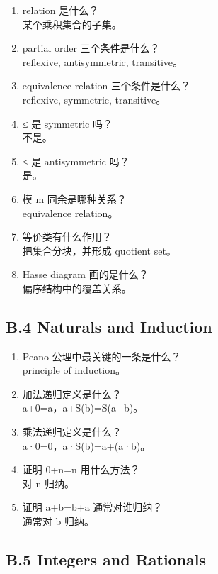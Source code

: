 \documentclass[
  11pt,
]{article}
\begin{document}
\begin{enumerate}
\def\labelenumi{\arabic{enumi}.}
\setcounter{enumi}{27}
\item
  relation 是什么？\\
  某个乘积集合的子集。
\item
  partial order 三个条件是什么？\\
  reflexive, antisymmetric, transitive。
\item
  equivalence relation 三个条件是什么？\\
  reflexive, symmetric, transitive。
\item
  ≤ 是 symmetric 吗？\\
  不是。
\item
  ≤ 是 antisymmetric 吗？\\
  是。
\item
  模 m 同余是哪种关系？\\
  equivalence relation。
\item
  等价类有什么作用？\\
  把集合分块，并形成 quotient set。
\item
  Hasse diagram 画的是什么？\\
  偏序结构中的覆盖关系。
\end{enumerate}

\subsection{B.4 Naturals and
Induction}\label{b.4-naturals-and-induction}

\begin{enumerate}
\def\labelenumi{\arabic{enumi}.}
\setcounter{enumi}{35}
\item
  Peano 公理中最关键的一条是什么？\\
  principle of induction。
\item
  加法递归定义是什么？\\
  a+0=a，a+S(b)=S(a+b)。
\item
  乘法递归定义是什么？\\
  a·0=0，a·S(b)=a+(a·b)。
\item
  证明 0+n=n 用什么方法？\\
  对 n 归纳。
\item
  证明 a+b=b+a 通常对谁归纳？\\
  通常对 b 归纳。
\end{enumerate}

\subsection{B.5 Integers and
Rationals}\label{b.5-integers-and-rationals}
\end{document}
